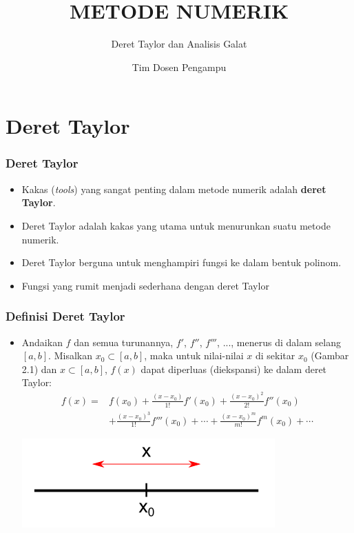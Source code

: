 \documentclass[pdflatex,compress]{beamer}
\title{METODE NUMERIK}
\subtitle{Deret Taylor dan Analisis Galat}
\author{Tim Dosen Pengampu}
\begin{document}
	
\maketitle
\section{Deret Taylor}

\begin{frame}
	\frametitle{Deret Taylor}
	\begin{itemize}
		\item Kakas (\textit{tools}) yang sangat penting dalam metode numerik adalah \textbf{deret Taylor}.
		\item Deret Taylor adalah kakas yang utama untuk menurunkan suatu metode numerik.
		\item Deret Taylor berguna untuk menghampiri fungsi ke dalam bentuk polinom.
		\item Fungsi yang rumit menjadi sederhana dengan deret Taylor
	\end{itemize}
\end{frame}

\begin{frame}
	\frametitle{Definisi Deret Taylor}
	\begin{itemize}
		\item Andaikan $ f $ dan semua turunannya, $ f' $, $ f'' $, $ f''' $, ..., menerus di dalam selang $ [a, b] $. Misalkan $ x_0 \subset [a, b] $, maka untuk nilai-nilai $ x $ di sekitar $ x_0 $ (Gambar 2.1) dan $ x \subset [a, b] $, $ f(x) $ dapat diperluas (diekspansi) ke dalam deret Taylor:
		\begin{align*}
			f(x) =& f(x_0) + \frac{(x-x_0)}{1!}f'(x_0) + \frac{(x-x_0)^2}{2!}f''(x_0) \\
			&+ \frac{(x-x_0)^3}{1!}f'''(x_0) + \cdots + \frac{(x-x_0)^m}{m!}f^m(x_0) + \cdots
		\end{align*}
		\begin{center}
			\includegraphics[width=0.5\linewidth]{img/img101}
		\end{center}
	\end{itemize}
\end{frame}
\end{document}
